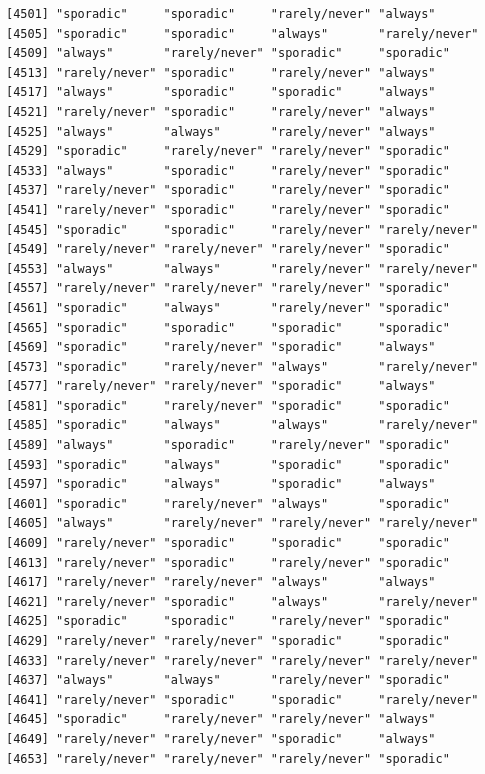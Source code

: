 \documentclass[
  letterpaper,
  DIV=11,
  numbers=noendperiod]{scrartcl}
\begin{document}
\begin{verbatim}
[4501] "sporadic"     "sporadic"     "rarely/never" "always"      
[4505] "sporadic"     "sporadic"     "always"       "rarely/never"
[4509] "always"       "rarely/never" "sporadic"     "sporadic"    
[4513] "rarely/never" "sporadic"     "rarely/never" "always"      
[4517] "always"       "sporadic"     "sporadic"     "always"      
[4521] "rarely/never" "sporadic"     "rarely/never" "always"      
[4525] "always"       "always"       "rarely/never" "always"      
[4529] "sporadic"     "rarely/never" "rarely/never" "sporadic"    
[4533] "always"       "sporadic"     "rarely/never" "sporadic"    
[4537] "rarely/never" "sporadic"     "rarely/never" "sporadic"    
[4541] "rarely/never" "sporadic"     "rarely/never" "sporadic"    
[4545] "sporadic"     "sporadic"     "rarely/never" "rarely/never"
[4549] "rarely/never" "rarely/never" "rarely/never" "sporadic"    
[4553] "always"       "always"       "rarely/never" "rarely/never"
[4557] "rarely/never" "rarely/never" "rarely/never" "sporadic"    
[4561] "sporadic"     "always"       "rarely/never" "sporadic"    
[4565] "sporadic"     "sporadic"     "sporadic"     "sporadic"    
[4569] "sporadic"     "rarely/never" "sporadic"     "always"      
[4573] "sporadic"     "rarely/never" "always"       "rarely/never"
[4577] "rarely/never" "rarely/never" "sporadic"     "always"      
[4581] "sporadic"     "rarely/never" "sporadic"     "sporadic"    
[4585] "sporadic"     "always"       "always"       "rarely/never"
[4589] "always"       "sporadic"     "rarely/never" "sporadic"    
[4593] "sporadic"     "always"       "sporadic"     "sporadic"    
[4597] "sporadic"     "always"       "sporadic"     "always"      
[4601] "sporadic"     "rarely/never" "always"       "sporadic"    
[4605] "always"       "rarely/never" "rarely/never" "rarely/never"
[4609] "rarely/never" "sporadic"     "sporadic"     "sporadic"    
[4613] "rarely/never" "sporadic"     "rarely/never" "sporadic"    
[4617] "rarely/never" "rarely/never" "always"       "always"      
[4621] "rarely/never" "sporadic"     "always"       "rarely/never"
[4625] "sporadic"     "sporadic"     "rarely/never" "sporadic"    
[4629] "rarely/never" "rarely/never" "sporadic"     "sporadic"    
[4633] "rarely/never" "rarely/never" "rarely/never" "rarely/never"
[4637] "always"       "always"       "rarely/never" "sporadic"    
[4641] "rarely/never" "sporadic"     "sporadic"     "rarely/never"
[4645] "sporadic"     "rarely/never" "rarely/never" "always"      
[4649] "rarely/never" "rarely/never" "sporadic"     "always"      
[4653] "rarely/never" "rarely/never" "rarely/never" "sporadic"    

\end{verbatim}
\end{document}

